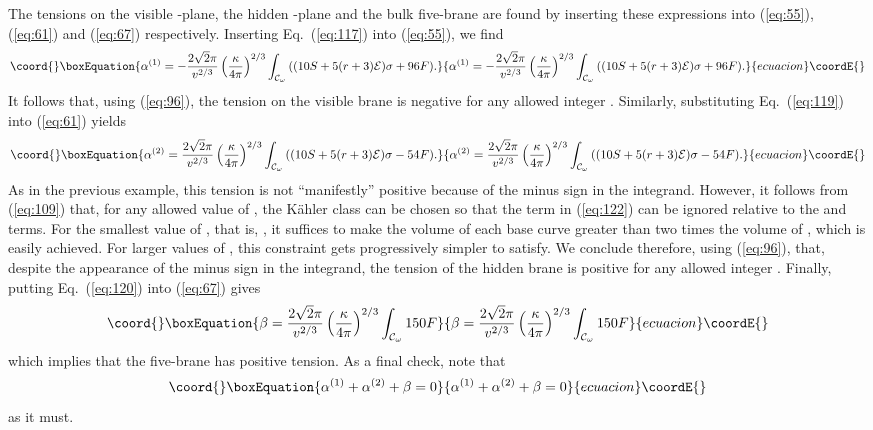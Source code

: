 \documentclass[a4paper,12pt]{article}
\numberwithin{equation}{section}
\theoremstyle{plain}
\begin{document}
The tensions on the visible \coordHE{}-plane, the hidden \coordHE{}-plane and the bulk
five-brane are found by inserting these expressions into (\ref{eq:55}),
(\ref{eq:61}) and (\ref{eq:67}) respectively. Inserting Eq.~(\ref{eq:117})
into (\ref{eq:55}), we find 
%
\begin{equation}\coord{}\boxEquation{
\alpha^{(1)}=-\frac{2\sqrt{2}\pi}{v^{2/3}}\left(\frac{\kappa}{4\pi}\right)^{2/3}
\int_{{\cal{C}}_{\omega}}{((10S+5(r+3){\cal{E}})\sigma+96F)}.
\label{eq:121}
}{
\alpha^{(1)}=-\frac{2\sqrt{2}\pi}{v^{2/3}}\left(\frac{\kappa}{4\pi}\right)^{2/3}
\int_{{\cal{C}}_{\omega}}{((10S+5(r+3){\cal{E}})\sigma+96F)}.
}{ecuacion}\coordE{}\end{equation}
%
It follows that, using (\ref{eq:96}), the tension on the visible brane is
negative for any allowed integer \coordHE{}. Similarly, substituting Eq.~(\ref{eq:119}) into (\ref{eq:61}) yields
%
\begin{equation}\coord{}\boxEquation{
\alpha^{(2)}=\frac{2\sqrt{2}\pi}{v^{2/3}}\left(\frac{\kappa}{4\pi}\right)^{2/3}
\int_{{\cal{C}}_{\omega}}{((10S+5(r+3){\cal{E}})\sigma-54F)}.
\label{eq:122}
}{
\alpha^{(2)}=\frac{2\sqrt{2}\pi}{v^{2/3}}\left(\frac{\kappa}{4\pi}\right)^{2/3}
\int_{{\cal{C}}_{\omega}}{((10S+5(r+3){\cal{E}})\sigma-54F)}.
}{ecuacion}\coordE{}\end{equation}
%
As in the previous example, this tension is not ``manifestly'' positive
because of the minus sign in the integrand. However, it follows from
(\ref{eq:109}) that, for any allowed value of \coordHE{}, the K\"{a}hler class can be chosen
so that the \coordHE{} term in (\ref{eq:122}) can be ignored relative to the
\coordHE{} and \coordHE{} terms. For the smallest value of \coordHE{}, that is, \coordHE{}, it
suffices to make the volume of each base curve greater than two times the
volume of \coordHE{}, which is easily achieved. For larger values of \coordHE{}, this
constraint gets progressively simpler to satisfy. We conclude therefore, using
(\ref{eq:96}), that, despite the appearance of the minus sign in the
integrand, the tension of the hidden brane is positive for any allowed integer
\coordHE{}. Finally, putting Eq.~(\ref{eq:120}) into (\ref{eq:67}) gives
%
\begin{equation}\coord{}\boxEquation{
\beta=\frac{2\sqrt{2}\pi}{v^{2/3}}\left(\frac{\kappa}{4\pi}\right)^{2/3}
\int_{{\cal{C}}_{\omega}}{150F}
\label{eq:123}
}{
\beta=\frac{2\sqrt{2}\pi}{v^{2/3}}\left(\frac{\kappa}{4\pi}\right)^{2/3}
\int_{{\cal{C}}_{\omega}}{150F}
}{ecuacion}\coordE{}\end{equation}
%
which implies that the five-brane has positive tension. As a final check, note
that
%
\begin{equation}\coord{}\boxEquation{
\alpha^{(1)}+\alpha^{(2)}+\beta=0
\label{eq:124}
}{
\alpha^{(1)}+\alpha^{(2)}+\beta=0
}{ecuacion}\coordE{}\end{equation}
%
as it must.
\end{document}
